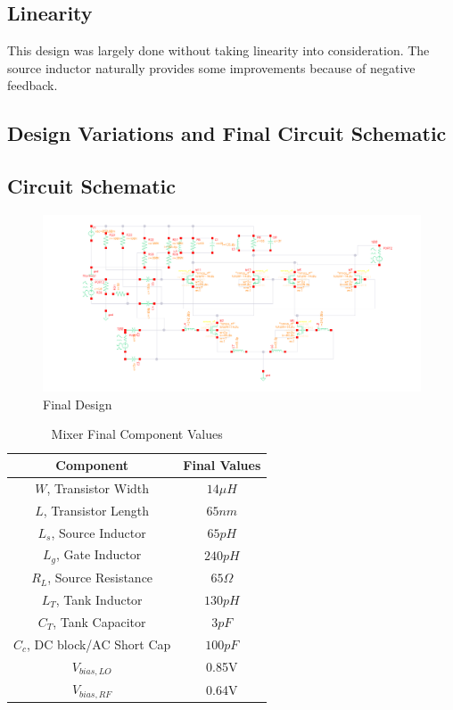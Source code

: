 \documentclass{article}                                                         %
\begin{document}
\subsection{Linearity}
This design was largely done without taking linearity into consideration. The source inductor naturally provides some
improvements because of negative feedback.

\newpage
\begin{landscape}
\section{Design Variations and Final Circuit Schematic}
\subsection{Circuit Schematic}

\begin{figure}[H]
  \centering
  \includegraphics[width=1.5\textwidth] {Figures/Circuit.png}
  \caption{Final Design}
    \label{fig:finalschem}
\end{figure}
\end{landscape}
\newpage

\begin{table}[H]
\centering
 \begin{tabular}{ | c | c |}
   \hline
    \textbf{Component} & \textbf{Final Values}   \\
    \hline
    \hline
    $W$, Transistor Width & $14 \mu H$ \\
    \hline
    $L$, Transistor Length & $65nm$ \\
    \hline
    $L_s$, Source Inductor & $65pH$ \\
    \hline
    $L_g$, Gate Inductor & $240pH$ \\
    \hline
    $R_L$, Source Resistance & $65\Omega$ \\
    \hline
    $L_T$, Tank Inductor & $130pH$ \\
    \hline
    $C_T$, Tank Capacitor & $3pF$ \\
    \hline
    $C_c$, DC block/AC Short Cap & $100pF$ \\
    \hline
    $V_{bias,LO}$ & 0.85V \\
    \hline
    $V_{bias,RF}$ & 0.64V \\
    \hline
  \end{tabular}
  \caption{Mixer Final Component Values}
  \label{table:finalvals}
\end{table}
\end{document}

